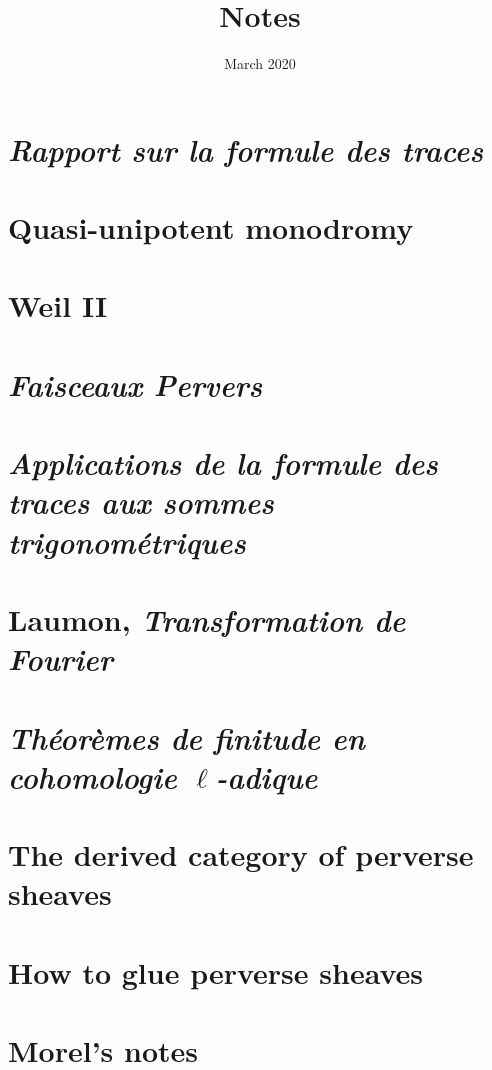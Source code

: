 \documentclass[12pt, fleqn, oneside, reqno]{amsbook}
\title{Notes}
\date{March 2020}
\theoremstyle{bfth}
\theoremstyle{bfthstar}
\theoremstyle{definition}
\theoremstyle{remark}
\begin{document}
\maketitle
{\setlength{\parskip}{0.5em}\small\tableofcontents\par}

\section{\emph{Rapport sur la formule des traces}}


\newpage
\setcounter{section}{1}
\section{Quasi-unipotent monodromy}


\newpage
\setcounter{section}{2}
\section{Weil II}


\newpage
\section{\emph{Faisceaux Pervers}}


\newpage
\section{\emph{Applications de la formule des traces aux sommes trigonométriques}}\label{sec:sommes_trig}


\newpage
\section{Laumon, \emph{Transformation de Fourier}}
\label{sec:laumon}


\newpage
\section{\emph{Théorèmes de finitude en
cohomologie $\ell$-adique}}\label{sec:thfin}


\newpage
\section{The derived category of perverse sheaves}


\newpage
\section{How to glue perverse sheaves}


\newpage
\section{Morel's notes}\label{morel}

\end{document}
